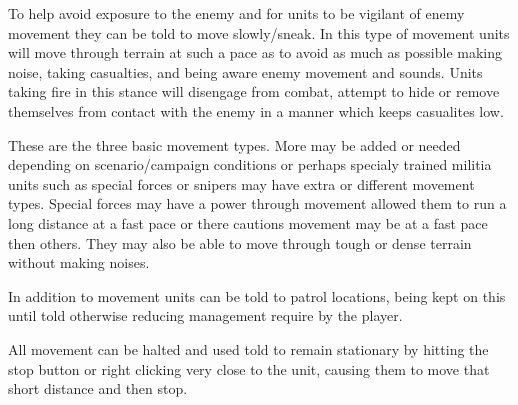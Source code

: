 To help avoid exposure to the enemy and for units to be vigilant of enemy movement they can be told to move slowly/sneak. In this type of movement units will move through terrain at such a pace as to avoid as much as possible making noise, taking casualties, and being aware enemy movement and sounds. Units taking fire in this stance will disengage from combat, attempt to hide or remove themselves from contact with the enemy in a manner which keeps casualites low.

These are the three basic movement types. More may be added or needed depending on scenario/campaign conditions or perhaps specialy trained militia units such as special forces or snipers may have extra or different movement types. Special forces may have a power through movement allowed them to run a long distance at a fast pace or there cautions movement may be at a fast pace then others. They may also be able to move through tough or dense terrain without making noises. 

In addition to movement units can be told to patrol locations, being kept on this until told otherwise reducing management require by the player.

All movement can be halted and used told to remain stationary by hitting the stop button or right clicking very close to the unit, causing them to move that short distance and then stop.


